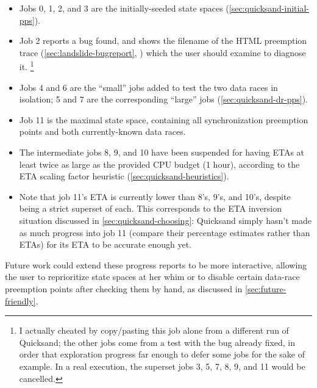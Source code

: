 \begin{itemize}
	\item Jobs 0, 1, 2, and 3 are the initially-seeded state spaces (\cref{sec:quicksand-initial-pps}).
	\item Job 2 reports a bug found, and shows the filename of the HTML preemption trace
		(\cref{sec:landslide-bugreport}, )
		which the user should examine to diagnose it.%
		\footnote{I actually cheated by copy/pasting this job alone from a different run of Quicksand;
		the other jobs come from a test with the bug already fixed,
		in order that exploration progress far enough to defer some jobs for the sake of example.
		In a real execution, the superset jobs 3, 5, 7, 8, 9, and 11 would be cancelled.}
	\item Jobs 4 and 6 are the ``small'' jobs added to test the two data races in isolation;
		5 and 7 are the corresponding ``large'' jobs (\cref{sec:quicksand-dr-pps}).
	\item Job 11 is the maximal state space, containing all synchronization preemption points
		and both currently-known data races.
	\item The intermediate jobs 8, 9, and 10 have been suspended for having ETAs
		at least twice as large as the provided CPU budget (1 hour),
		according to the ETA scaling factor heuristic (\cref{sec:quicksand-heuristics}).
	\item Note that job 11's ETA is currently lower than 8's, 9's, and 10's, despite being a strict superset of each.
		This corresponds to the ETA inversion situation discussed in \cref{sec:quicksand-choosing}:
		Quicksand simply hasn't made as much progress into job 11 (compare their percentage estimates rather than ETAs)
		for its ETA to be accurate enough yet.
\end{itemize}
Future work could extend these progress reports to be more interactive,
allowing the user to reprioritize state spaces at her whim
or to disable certain data-race preemption points after checking them by hand,
as discussed in \cref{sec:future-friendly}.

